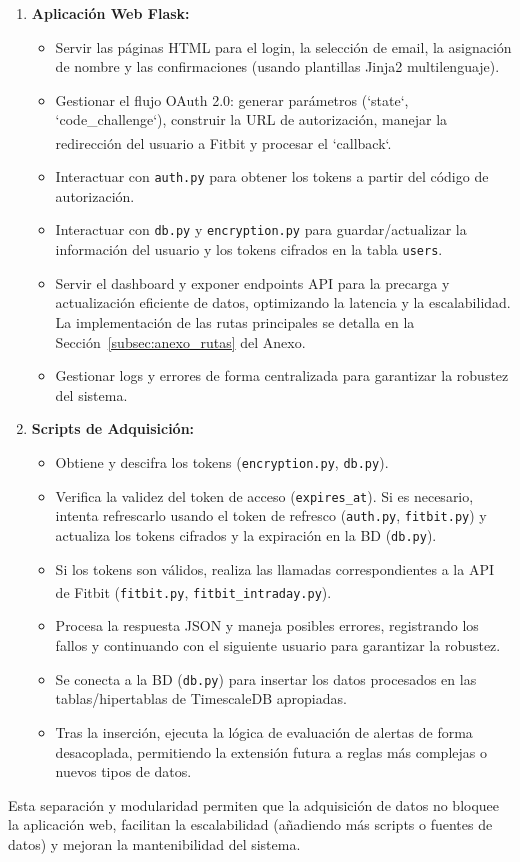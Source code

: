 \begin{enumerate}
    \item \textbf{Aplicación Web Flask:} 
        \begin{itemize}
            \item Servir las páginas HTML para el login, la selección de email, la asignación de nombre y las confirmaciones (usando plantillas Jinja2 multilenguaje).
            \item Gestionar el flujo OAuth 2.0: generar parámetros (`state`, `code\_challenge`), construir la URL de autorización, manejar la redirección del usuario a Fitbit\textsuperscript{\textregistered} y procesar el `callback`.
            \item Interactuar con \texttt{auth.py} para obtener los tokens a partir del código de autorización.
            \item Interactuar con \texttt{db.py} y \texttt{encryption.py} para guardar/actualizar la información del usuario y los tokens cifrados en la tabla \texttt{users}.
            \item Servir el dashboard y exponer endpoints API para la precarga y actualización eficiente de datos, optimizando la latencia y la escalabilidad. La implementación de las rutas principales se detalla en la Sección~\ref{subsec:anexo_rutas} del Anexo.
            \item Gestionar logs y errores de forma centralizada para garantizar la robustez del sistema.
        \end{itemize}
    \item \textbf{Scripts de Adquisición:} 
        \begin{itemize}
            \item Obtiene y descifra los tokens (\texttt{encryption.py}, \texttt{db.py}).
            \item Verifica la validez del token de acceso (\texttt{expires\_at}). Si es necesario, intenta refrescarlo usando el token de refresco (\texttt{auth.py}, \texttt{fitbit.py}) y actualiza los tokens cifrados y la expiración en la BD (\texttt{db.py}).
            \item Si los tokens son válidos, realiza las llamadas correspondientes a la API de Fitbit\textsuperscript{\textregistered} (\texttt{fitbit.py}, \texttt{fitbit\_intraday.py}).
            \item Procesa la respuesta JSON y maneja posibles errores, registrando los fallos y continuando con el siguiente usuario para garantizar la robustez.
            \item Se conecta a la BD (\texttt{db.py}) para insertar los datos procesados en las tablas/hipertablas de TimescaleDB apropiadas.
            \item Tras la inserción, ejecuta la lógica de evaluación de alertas de forma desacoplada, permitiendo la extensión futura a reglas más complejas o nuevos tipos de datos.
        \end{itemize}
\end{enumerate}
Esta separación y modularidad permiten que la adquisición de datos no bloquee la aplicación web, facilitan la escalabilidad (añadiendo más scripts o fuentes de datos) y mejoran la mantenibilidad del sistema.

